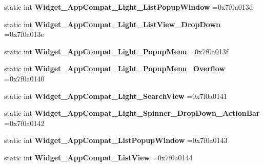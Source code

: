 \begin{DoxyCompactItemize}
static int {\bfseries Widget\+\_\+\+App\+Compat\+\_\+\+Light\+\_\+\+List\+Popup\+Window} =0x7f0a013d
\item 
\mbox{\label{classandroid_1_1support_1_1v7_1_1cardview_1_1R_1_1style_a5362e920500e1370f5a5e9090eb27c02}} 
static int {\bfseries Widget\+\_\+\+App\+Compat\+\_\+\+Light\+\_\+\+List\+View\+\_\+\+Drop\+Down} =0x7f0a013e
\item 
\mbox{\label{classandroid_1_1support_1_1v7_1_1cardview_1_1R_1_1style_a3c1ff43f4560faff185f0715b7a8fb47}} 
static int {\bfseries Widget\+\_\+\+App\+Compat\+\_\+\+Light\+\_\+\+Popup\+Menu} =0x7f0a013f
\item 
\mbox{\label{classandroid_1_1support_1_1v7_1_1cardview_1_1R_1_1style_a330c8b8700a950f8b394e4260ec14d7d}} 
static int {\bfseries Widget\+\_\+\+App\+Compat\+\_\+\+Light\+\_\+\+Popup\+Menu\+\_\+\+Overflow} =0x7f0a0140
\item 
\mbox{\label{classandroid_1_1support_1_1v7_1_1cardview_1_1R_1_1style_a70120ddea0ff9808ef39676c37279425}} 
static int {\bfseries Widget\+\_\+\+App\+Compat\+\_\+\+Light\+\_\+\+Search\+View} =0x7f0a0141
\item 
\mbox{\label{classandroid_1_1support_1_1v7_1_1cardview_1_1R_1_1style_a4b47a92886b9ccd616a646235de9b972}} 
static int {\bfseries Widget\+\_\+\+App\+Compat\+\_\+\+Light\+\_\+\+Spinner\+\_\+\+Drop\+Down\+\_\+\+Action\+Bar} =0x7f0a0142
\item 
\mbox{\label{classandroid_1_1support_1_1v7_1_1cardview_1_1R_1_1style_a762941094d92d658e172a48e7cbb634b}} 
static int {\bfseries Widget\+\_\+\+App\+Compat\+\_\+\+List\+Popup\+Window} =0x7f0a0143
\item 
\mbox{\label{classandroid_1_1support_1_1v7_1_1cardview_1_1R_1_1style_a80f8ef28e44432ba97e5750a33c27d2b}} 
static int {\bfseries Widget\+\_\+\+App\+Compat\+\_\+\+List\+View} =0x7f0a0144
\item 

\end{DoxyCompactItemize}
